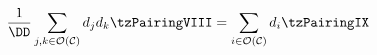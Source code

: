 \documentclass[border=3pt]{standalone}
\begin{document}
$\displaystyle
\frac{1}{\DD}\sum_{j,k\in \OC}d_{j}d_{k}\tzPairingVIII
=
\sum_{i\in \OC}d_{i}\tzPairingIX
$
\end{document}
